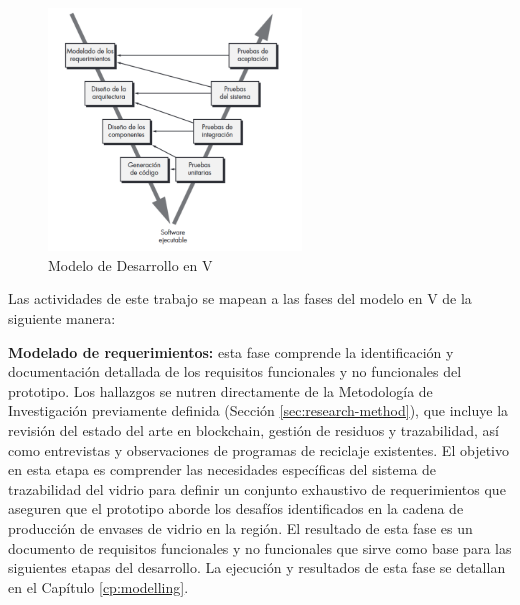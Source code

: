 \begin{figure}[!htpb]
    \centering
    \includegraphics[width=0.6\textwidth]{Figures/model-v.png}
    \caption{Modelo de Desarrollo en V \cite{pressman2010ingeneria}}
    \label{fig:methodology-v}
\end{figure}


Las actividades de este trabajo se mapean a las fases del modelo en V de la siguiente manera:

\textbf{Modelado de requerimientos:}
esta fase comprende la identificación y documentación detallada de los requisitos funcionales y no funcionales del prototipo. Los hallazgos se nutren directamente de la Metodología de Investigación previamente definida (Sección \ref{sec:research-method}), que incluye la revisión del estado del arte en blockchain, gestión de residuos y trazabilidad, así como entrevistas y observaciones de programas de reciclaje existentes. El objetivo en esta etapa es comprender las necesidades específicas del sistema de trazabilidad del vidrio para definir un conjunto exhaustivo de requerimientos que aseguren que el prototipo aborde los desafíos identificados en la cadena de producción de envases de vidrio en la región. El resultado de esta fase es un documento de requisitos funcionales y no funcionales que sirve como base para las siguientes etapas del desarrollo. La ejecución y resultados de esta fase se detallan en el Capítulo \ref{cp:modelling}.

